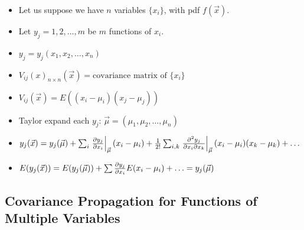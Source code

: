 \begin{itemize}
    \item Let us suppose we have $n$ variables $\{ x_i \}$, with pdf $f(\vec{x})$.
    \item Let $y_j = 1, 2, \ldots, m$ be $m$ functions of $x_i$.
    \item $y_j = y_j(x_1, x_2, \ldots, x_n)$
    \item $V_{ij}(x)_{n \times n}(\vec{x}) = \text{covariance matrix of } \{x_i\}$
    \item $V_{ij}(\vec{x}) = E((x_i - \mu_i)(x_j - \mu_j))$
    \item Taylor expand each $y_j$: $\vec{\mu} = (\mu_1, \mu_2, \ldots, \mu_n)$
    \item $y_j(\vec{x}) = y_j(\vec{\mu}) + \sum_i \left. \pdv{y_j}{x_i} \right|_{\vec{\mu}} (x_i - \mu_i) + \frac{1}{2!} \sum_{i,k} \left. \pdv[2]{y_j}{x_i}{x_k} \right|_{\vec{\mu}} (x_i - \mu_i)(x_k - \mu_k) + \ldots$
    \item $E(y_j(\vec{x})) = E(y_{j}(\vec{\mu})) + \sum \pdv{y_j}{x_i} E(x_i - \mu_i) + \ldots = y_j(\vec{\mu})$
\end{itemize}

\subsection{Covariance Propagation for Functions of Multiple Variables}


